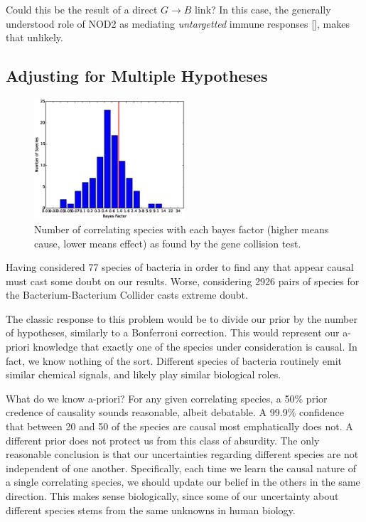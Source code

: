 \documentclass[letterpaper]{article}
\begin{document}
Could this be the result of a direct $G\rightarrow B$ link?  In this
case, the generally
understood role of NOD2 as mediating \textit{untargetted} immune
responses [\cite{nod2}], makes that unlikely.

\subsection{Adjusting for Multiple Hypotheses}

\begin{figure}[b!]
  \includegraphics[width=0.5\textwidth]{histogram}
  \caption{Number of correlating species with each bayes factor
    (higher means cause, lower means effect) as found by the gene
    collision test.}
  \label{hist}
\end{figure}

Having considered 77 species of bacteria in order to find any that
appear causal must cast some doubt on our results.  Worse, considering
2926 pairs of species for the Bacterium-Bacterium Collider casts extreme
doubt.

The classic response to this problem would be to divide our prior by
the number of hypotheses, similarly to a Bonferroni correction.  This
would represent our a-priori knowledge that exactly one of the species
under consideration is causal.  In fact, we know nothing of the sort.
Different species of bacteria routinely emit similar chemical signals,
and likely play similar biological roles.

What do we know a-priori?  For any given correlating species, a 50\%
prior credence of causality sounds reasonable, albeit debatable.  A
99.9\% confidence that between 20 and 50 of the species are causal
most emphatically does not.  A different prior does not protect us
from this class of absurdity.  The only reasonable conclusion is that
our uncertainties regarding different species are not independent of
one another.  Specifically, each time we learn the causal nature of a
single correlating species, we should update our belief in the others
in the same direction.  This makes sense biologically, since some of
our uncertainty about different species stems from the same unknowns
in human biology.
\end{document}
